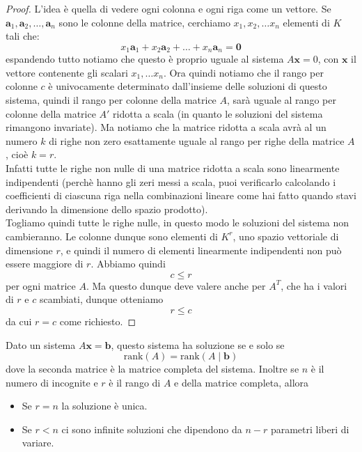 \documentclass[11pt]{scrartcl}
\begin{document}
 	\begin{proof}
 		L'idea è quella di vedere ogni colonna e ogni riga come un vettore. Se $\mathbf{a}_1,\mathbf{a}_2,\dots,\mathbf{a}_n$ sono le colonne della matrice, cerchiamo $x_1,x_2,\dots x_n$ elementi di $K$ tali che:
 		$$x_1\mathbf{a}_1+x_2\mathbf{a}_2+\dots + x_n\mathbf{a}_n=\mathbf{0}$$
 		espandendo tutto notiamo che questo è proprio uguale al sistema $A\mathbf{x}=0$, con $\mathbf{x}$ il vettore contenente gli scalari $x_1,\dots x_n$. Ora quindi notiamo che il rango per colonne $c$ è univocamente determinato dall'insieme delle soluzioni di questo sistema, quindi il rango per colonne della matrice $A$, sarà uguale al rango per colonne della matrice $A'$ ridotta a scala (in quanto le soluzioni del sistema rimangono invariate). Ma notiamo che la matrice ridotta a scala avrà al un numero $k$ di righe non zero esattamente uguale al rango per righe della matrice $A$, cioè $k=r$. \\ 
 		Infatti tutte le righe non nulle di una matrice ridotta a scala sono linearmente indipendenti (perchè hanno gli zeri messi a scala, puoi verificarlo calcolando i coefficienti di ciascuna riga nella combinazioni lineare come hai fatto quando stavi derivando la dimensione dello spazio prodotto). \\
 		Togliamo quindi tutte le righe nulle, in questo modo le soluzioni del sistema non cambieranno. Le colonne dunque sono elementi di $K^r$, uno spazio vettoriale di dimensione $r$, e quindi il numero di elementi linearmente indipendenti non può essere maggiore di $r$. Abbiamo quindi
 		$$c\le r$$
 		per ogni matrice $A$. Ma questo dunque deve valere anche per $A^T$, che ha i valori di $r$ e $c$ scambiati, dunque otteniamo
 		$$r\le c$$
 		da cui $r=c$ come richiesto.
 	\end{proof}
 	\begin{theorem}
 		Dato un sistema $A\mathbf{x}=\mathbf{b}$, questo sistema ha soluzione se e solo se 
 		$$\text{rank}(A)=\text{rank}(A\mid\mathbf{b})$$
 		dove la seconda matrice è la matrice completa del sistema. Inoltre se $n$ è il numero di incognite e $r$ è il rango di $A$ e della matrice completa, allora
 		\begin{itemize}
 			\item Se $r=n$ la soluzione è unica.
 			\item Se $r<n$ ci sono infinite soluzioni che dipendono da $n-r$ parametri liberi di variare.
 		\end{itemize}
 	\end{theorem}
\end{document}
